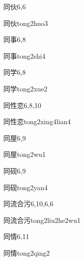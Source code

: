 \begin{entry}{同伙}{6,6}
  \begin{phonetics}{同伙}{tong2huo3}
  \end{phonetics}
\end{entry}

\begin{entry}{同事}{6,8}
  \begin{phonetics}{同事}{tong2shi4}
  \end{phonetics}
\end{entry}

\begin{entry}{同学}{6,8}
  \begin{phonetics}{同学}{tong2xue2}
  \end{phonetics}
\end{entry}

\begin{entry}{同性恋}{6,8,10}
  \begin{phonetics}{同性恋}{tong2xing4lian4}
  \end{phonetics}
\end{entry}

\begin{entry}{同屋}{6,9}
  \begin{phonetics}{同屋}{tong2wu1}
  \end{phonetics}
\end{entry}

\begin{entry}{同砚}{6,9}
  \begin{phonetics}{同砚}{tong2yan4}
  \end{phonetics}
\end{entry}

\begin{entry}{同流合污}{6,10,6,6}
  \begin{phonetics}{同流合污}{tong2liu2he2wu1}
  \end{phonetics}
\end{entry}

\begin{entry}{同情}{6,11}
  \begin{phonetics}{同情}{tong2qing2}
  \end{phonetics}
\end{entry}

